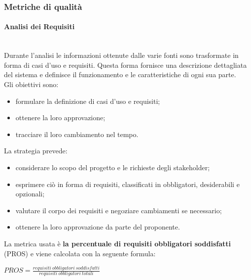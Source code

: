 
\subsubsection{Metriche di qualità}
\paragraph{Analisi dei Requisiti} \mbox{}\\

\noindent Durante l'analisi le informazioni ottenute dalle varie fonti sono trasformate in forma di casi d’uso e requisiti. Questa forma fornisce una descrizione dettagliata del sistema e definisce il funzionamento e le caratteristiche di ogni sua parte. \\
Gli obiettivi sono:
\begin{itemize}
	\item formulare la definizione di casi d'uso e requisiti;
	\item ottenere la loro approvazione;
	\item tracciare il loro cambiamento nel tempo.
\end{itemize}
La strategia prevede: 
\begin{itemize}
	\item considerare lo scopo del progetto e le richieste degli stakeholder;
	\item esprimere ciò in forma di requisiti, classificati in obbligatori, desiderabili e opzionali;
	\item valutare il corpo dei requisiti e negoziare cambiamenti se necessario;
	\item ottenere la loro approvazione da parte del proponente.
\end{itemize}
La metrica usata è \textbf{la percentuale di requisiti obbligatori soddisfatti} (PROS) e viene calcolata con la seguente formula:

\begin{center}  $ PROS = \frac{requisiti\ obbligatori\ soddisfatti}{requisiti\ obbligatori\ totali}$
\end{center}

